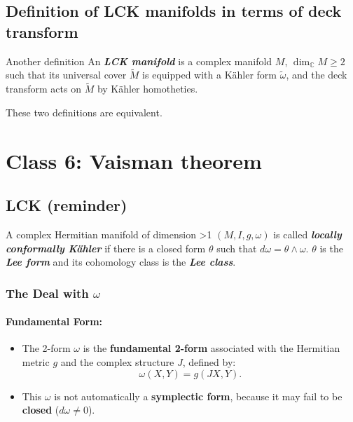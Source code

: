 \subsection{Definition of LCK manifolds in terms of deck transform}

\begin{thing6}{Another definition}\leavevmode
An \textit{\textbf{LCK manifold}} is a complex manifold \(M\), \(\dim_\mathbb{C} M \geq 2\) such that its universal cover \(\tilde{M}\) is equipped with a Kähler form \(\tilde{\omega}\), and the deck transform acts on \(\tilde{M}\) by Kähler homotheties.
\end{thing6}

\begin{thm}\leavevmode
	These two definitions are equivalent.
\end{thm}

\section{Class 6: Vaisman theorem}

\subsection{LCK (reminder)}

\begin{defn}\leavevmode
A complex Hermitian manifold of dimension >1 \((M,I,g,\omega)\) is called \textit{\textbf{locally conformally Kähler}} if there is a closed form \(\theta\) such that \(d \omega =\theta \wedge \omega\). \(\theta\) is the \textit{\textbf{Lee form}} and its cohomology class is the \textit{\textbf{Lee class}}.
\end{defn}

\subsubsection*{The Deal with \(\omega\)}

\paragraph{Fundamental Form:}
\begin{itemize}
    \item The 2-form \(\omega\) is the \textbf{fundamental 2-form} associated with the Hermitian metric \(g\) and the complex structure \(J\), defined by:
    \[
    \omega(X, Y) = g(JX, Y).
    \]
    \item This \(\omega\) is not automatically a \textbf{symplectic form}, because it may fail to be \textbf{closed} (\(d\omega \neq 0\)).
\end{itemize}

